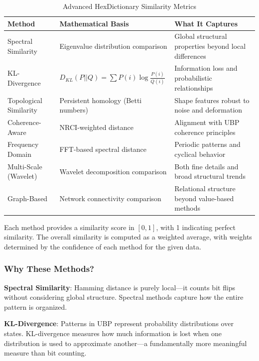 \documentclass[12pt, a4paper]{article}
\begin{document}
\begin{table}[H]
\centering
\caption{Advanced HexDictionary Similarity Metrics}
\label{tab:hex_methods}
\begin{tabular}{@{}p{3.5cm}p{5cm}p{5.5cm}@{}}
\toprule
\textbf{Method} & \textbf{Mathematical Basis} & \textbf{What It Captures} \\
\midrule
Spectral Similarity & Eigenvalue distribution comparison & Global structural properties beyond local differences \\
\midrule
KL-Divergence & $D_{KL}(P||Q) = \sum P(i) \log \frac{P(i)}{Q(i)}$ & Information loss and probabilistic relationships \\
\midrule
Topological Similarity & Persistent homology (Betti numbers) & Shape features robust to noise and deformation \\
\midrule
Coherence-Aware & NRCI-weighted distance & Alignment with UBP coherence principles \\
\midrule
Frequency Domain & FFT-based spectral distance & Periodic patterns and cyclical behavior \\
\midrule
Multi-Scale (Wavelet) & Wavelet decomposition comparison & Both fine details and broad structural trends \\
\midrule
Graph-Based & Network connectivity comparison & Relational structure beyond value-based methods \\
\bottomrule
\end{tabular}
\end{table}

Each method provides a similarity score in $[0, 1]$, with 1 indicating perfect similarity. The overall similarity is computed as a weighted average, with weights determined by the confidence of each method for the given data.

\subsubsection{Why These Methods?}

\textbf{Spectral Similarity}: Hamming distance is purely local—it counts bit flips without considering global structure. Spectral methods capture how the entire pattern is organized.

\textbf{KL-Divergence}: Patterns in UBP represent probability distributions over states. KL-divergence measures how much information is lost when one distribution is used to approximate another—a fundamentally more meaningful measure than bit counting.
\end{document}
